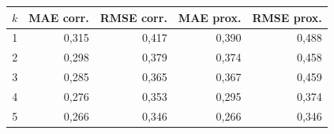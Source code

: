 \begin{tabular}{rrrrr}
\toprule
$k$ & MAE corr. & RMSE corr. & MAE prox. & RMSE prox. \\
\midrule
1 & 0,315 & 0,417 & 0,390 & 0,488 \\
2 & 0,298 & 0,379 & 0,374 & 0,458 \\
3 & 0,285 & 0,365 & 0,367 & 0,459 \\
4 & 0,276 & 0,353 & 0,295 & 0,374 \\
5 & 0,266 & 0,346 & 0,266 & 0,346 \\
\bottomrule
\end{tabular}
